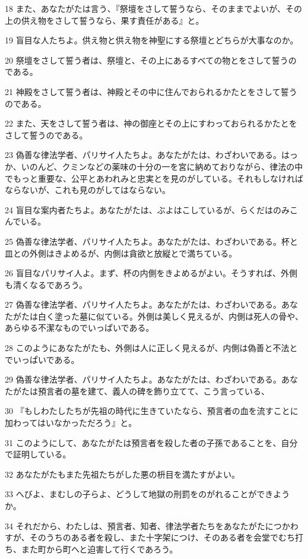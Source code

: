 \par 18 また、あなたがたは言う、『祭壇をさして誓うなら、そのままでよいが、その上の供え物をさして誓うなら、果す責任がある』と。
\par 19 盲目な人たちよ。供え物と供え物を神聖にする祭壇とどちらが大事なのか。
\par 20 祭壇をさして誓う者は、祭壇と、その上にあるすべての物とをさして誓うのである。
\par 21 神殿をさして誓う者は、神殿とその中に住んでおられるかたとをさして誓うのである。
\par 22 また、天をさして誓う者は、神の御座とその上にすわっておられるかたとをさして誓うのである。
\par 23 偽善な律法学者、パリサイ人たちよ。あなたがたは、わざわいである。はっか、いのんど、クミンなどの薬味の十分の一を宮に納めておりながら、律法の中でもっと重要な、公平とあわれみと忠実とを見のがしている。それもしなければならないが、これも見のがしてはならない。
\par 24 盲目な案内者たちよ。あなたがたは、ぶよはこしているが、らくだはのみこんでいる。
\par 25 偽善な律法学者、パリサイ人たちよ。あなたがたは、わざわいである。杯と皿との外側はきよめるが、内側は貪欲と放縦とで満ちている。
\par 26 盲目なパリサイ人よ。まず、杯の内側をきよめるがよい。そうすれば、外側も清くなるであろう。
\par 27 偽善な律法学者、パリサイ人たちよ。あなたがたは、わざわいである。あなたがたは白く塗った墓に似ている。外側は美しく見えるが、内側は死人の骨や、あらゆる不潔なものでいっぱいである。
\par 28 このようにあなたがたも、外側は人に正しく見えるが、内側は偽善と不法とでいっぱいである。
\par 29 偽善な律法学者、パリサイ人たちよ。あなたがたは、わざわいである。あなたがたは預言者の墓を建て、義人の碑を飾り立てて、こう言っている、
\par 30 『もしわたしたちが先祖の時代に生きていたなら、預言者の血を流すことに加わってはいなかっただろう』と。
\par 31 このようにして、あなたがたは預言者を殺した者の子孫であることを、自分で証明している。
\par 32 あなたがたもまた先祖たちがした悪の枡目を満たすがよい。
\par 33 へびよ、まむしの子らよ、どうして地獄の刑罰をのがれることができようか。
\par 34 それだから、わたしは、預言者、知者、律法学者たちをあなたがたにつかわすが、そのうちのある者を殺し、また十字架につけ、そのある者を会堂でむち打ち、また町から町へと迫害して行くであろう。
